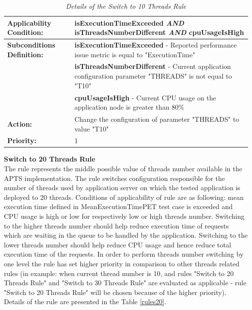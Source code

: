 \documentclass[12pt,a4paper]{article}
\begin{document}
\begin{table}[!htb]
\begin{center}
\begin{tabularx}{\textwidth}{l|X}

\textbf{Applicability Condition:} & \textbf{isExecutionTimeExceeded} \textit{AND} \newline
\textbf{isThreadsNumberDifferent} \textit{AND} \newline
\textbf{cpuUsageIsHigh} \\ \hline

\textbf{Subconditions Definition:} & \textbf{isExecutionTimeExceeded} -  Reported performance issue metric is equal to "ExecutionTime"  \\
& \textbf{isThreadsNumberDifferent} -  Current application configuration parameter "THREADS" is not equal to "T10" \\
& \textbf{cpuUsageIsHigh} - Current CPU usage on the application node is greater than 80\% \\ \hline

\textbf{Action:} & Change the configuration of parameter "THREADS" to value "T10" \\ \hline
\textbf{Priority:} & 1\\
\end{tabularx}
\end{center}
\caption{\textit{Details of the Switch to 10 Threads Rule}} \label{rules10}
\end{table}
\vspace{5mm}
\noindent\textbf{Switch to 20 Threads Rule} \\
The rule represents the middle possible value of threads number available in the APTS implementation. The rule switches configuration responsible for the number of threads used by application server on which the tested application is deployed to 20 threads. Conditions of applicability of rule are as following: mean execution time defined in MeanExecutionTimePET test case is exceeded and CPU usage is high or low for respectively low or high threads number. Switching to the higher threads number should help reduce execution time of requests which are waiting in the queue to be handled by the application. Switching to the lower threads number should help reduce CPU usage and hence reduce total execution time of the requests. In order to perform threads number switching by one level the rule has set higher priority in comparison to other threads related rules (in example: when current thread number is 10, and rules "Switch to 20 Threads Rule" and "Switch to 30 Threads Rule" are evaluated as applicable - rule "Switch to 20 Threads Rule" will be chosen because of the higher priority). Details of the rule are presented in the Table \ref{rules20}.
\end{document}

